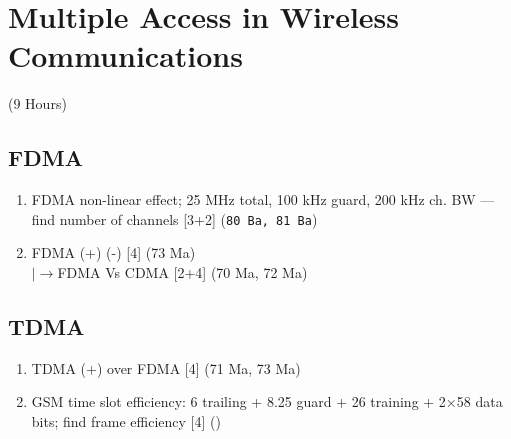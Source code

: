 \documentclass[12pt]{article}
\newcommand{\lb}{\\$\left|\rightarrow\right.$}
\begin{document}
\pagebreak
\section{Multiple Access in Wireless Communications}
\begin{center}(9 Hours)\end{center}

  \subsection{FDMA}
    \begin{enumerate}[topsep=0pt, noitemsep]
      \item FDMA non-linear effect; 25 MHz total, 100 kHz guard, 200 kHz ch. BW
        --- find number of channels \hfill [3+2] (\texttt{80 Ba, 81 Ba})
      \item FDMA (+) (-) \hfill [4] (73 Ma)
        \lb FDMA Vs CDMA \hfill [2+4] (70 Ma, 72 Ma)
    \end{enumerate}

  \subsection{TDMA}
    \begin{enumerate}[topsep=0pt, noitemsep]
      \item TDMA (+) over FDMA \hfill [4] (71 Ma, 73 Ma)
      \item GSM time slot efficiency: 6 trailing + 8.25 guard + 26 training + 2×58 data bits;
        find frame efficiency \hfill [4] ()
    \end{enumerate}
\end{document}
